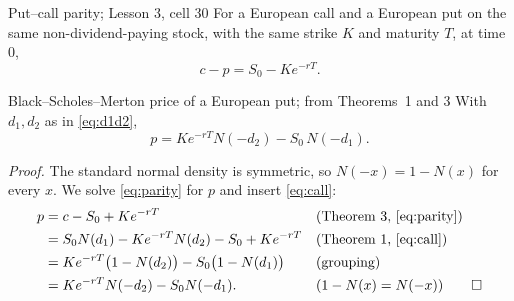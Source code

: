 \documentclass[11pt,a4paper]{article}
\begin{document}
\bigskip
\begin{thmbox}{Put--call parity; Lesson 3, cell 30}
For a European call and a European put on the same non-dividend-paying stock, with the same strike $K$ and maturity $T$, at time $0$,
\begin{equation}\label{eq:parity}
c-p=S_0-K e^{-rT}.
\end{equation}
\end{thmbox}

\begin{lembox}{Black--Scholes--Merton price of a European put; from Theorems~1 and 3}
With $d_1,d_2$ as in \eqref{eq:d1d2},
\begin{equation}\label{eq:put}
p=K e^{-rT}N(-d_2)-S_0\,N(-d_1).
\end{equation}
\end{lembox}

\noindent\textit{Proof.} The standard normal density is symmetric, so $N(-x)=1-N(x)$ for every $x$. We solve \eqref{eq:parity} for $p$ and insert \eqref{eq:call}:
\begin{align*}
p &= c-S_0+Ke^{-rT} && \text{(Theorem~3, \eqref{eq:parity})}\\
&= S_0N(d_1)-Ke^{-rT}N(d_2)-S_0+Ke^{-rT} && \text{(Theorem~1, \eqref{eq:call})}\\
&= Ke^{-rT}\bigl(1-N(d_2)\bigr)-S_0\bigl(1-N(d_1)\bigr) && \text{(grouping)}\\
&= Ke^{-rT}N(-d_2)-S_0N(-d_1). && \text{($1-N(x)=N(-x)$)} \tag*{$\square$}
\end{align*}
\end{document}

